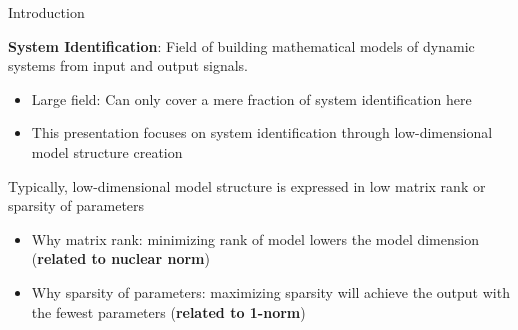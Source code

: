 



\begin{frame}{Introduction}{\cite{vandenberghe2012convex,Soderstrom1988System}}

\textbf{System Identification}: Field of building mathematical models of dynamic systems from input and output signals.
\begin{itemize}
\item Large field: Can only cover a mere fraction of system identification here
\item This presentation focuses on system identification through {\bor low-dimensional model} structure creation
\end{itemize}
Typically, {\bor low-dimensional model} structure is expressed in {\bdgr low matrix rank} or {\bdgr sparsity of parameters}
\begin{itemize}
    \item Why {\bdgr matrix rank}: minimizing rank of model lowers the model dimension (\textbf{related to nuclear norm})
    \item Why {\bdgr sparsity of parameters}: maximizing sparsity will achieve the output with the fewest parameters (\textbf{related to 1-norm})
\end{itemize}
\end{frame}{}

